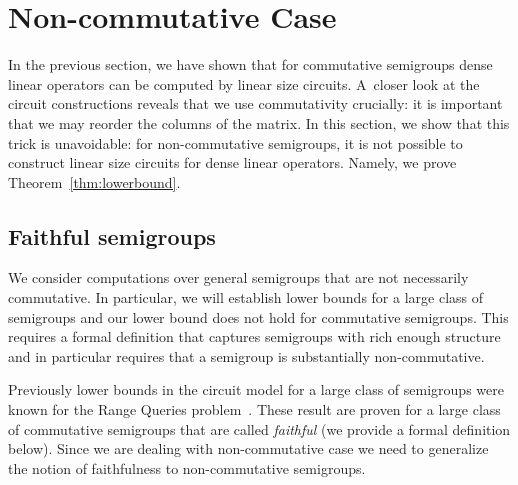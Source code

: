\documentclass[11pt,letterpaper]{article}
\begin{document}



\section{Non-commutative Case}\label{sec-non-commutative}

In the previous section, we have shown that for commutative semigroups dense linear operators can be computed by linear size circuits. A~closer look at the circuit constructions reveals that we use commutativity crucially: it is important that we may reorder the columns of the matrix. In this section, we show that this trick is unavoidable: for non-commutative semigroups, it is not possible to construct linear size circuits for dense linear operators. Namely, we prove Theorem~\ref{thm:lowerbound}.

\lowerthm*

\subsection{Faithful semigroups}

We consider computations over general semigroups that are not necessarily commutative. In particular, we will establish lower bounds for a large class of semigroups and our lower bound does not hold for commutative semigroups. This requires a formal definition that captures semigroups with rich enough structure and in particular requires that a semigroup is substantially non-commutative.

Previously lower bounds in the circuit model for a large class of semigroups were known for the Range Queries problem~\cite{DBLP:conf/stoc/Yao82,DBLP:journals/ijcga/ChazelleR91}. These result are proven for a large class of commutative semigroups that are called \emph{faithful} (we provide a formal definition below). Since we are dealing with non-commutative case we need to generalize the notion of faithfulness to non-commutative semigroups.
\end{document}
